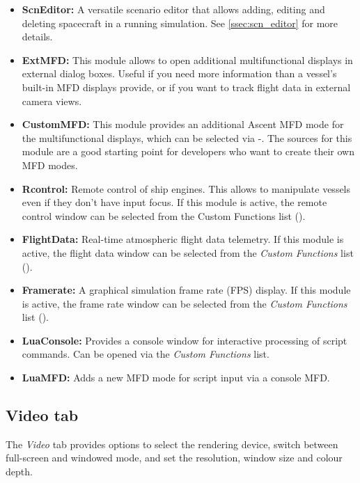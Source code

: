 \documentclass[Orbiter User Manual.tex]{subfiles}
\begin{document}
\begin{itemize}
\item \textbf{ScnEditor:} A versatile scenario editor that allows adding, editing and deleting spacecraft in a running simulation. See \ref{ssec:scn_editor} for more details.
\item \textbf{ExtMFD:} This module allows to open additional multifunctional displays in external dialog boxes. Useful if you need more information than a vessel's built-in MFD displays provide, or if you want to track flight data in external camera views.
\item \textbf{CustomMFD:} This module provides an additional Ascent MFD mode for the multifunctional displays, which can be selected via \Shift{}-\Shift{}. The sources for this module are a good starting point for developers who want to create their own MFD modes.
\item \textbf{Rcontrol:} Remote control of ship engines. This allows to manipulate vessels even if they don't have input focus. If this module is active, the remote control window can be selected from the Custom Functions list (\Ctrl{}).
\item \textbf{FlightData:} Real-time atmospheric flight data telemetry. If this module is active, the flight data window can be selected from the \textit{Custom Functions} list (\Ctrl{}).
\item \textbf{Framerate:} A graphical simulation frame rate (FPS) display. If this module is active, the frame rate window can be selected from the \textit{Custom Functions} list (\Ctrl{}).
\item \textbf{LuaConsole:} Provides a console window for interactive processing of script commands. Can be opened via the \textit{Custom Functions} list.
\item \textbf{LuaMFD:} Adds a new MFD mode for script input via a console MFD.
\end{itemize}


\subsection{Video tab}
\label{ssec:launchpad_video}
The \textit{Video} tab provides options to select the rendering device, switch between full-screen and windowed mode, and set the resolution, window size and colour depth.

\begin{figure}[H]
	\centering
\end{figure}
\end{document}
